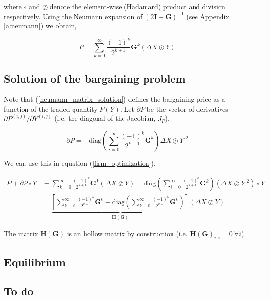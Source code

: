 \documentclass[american]{scrartcl}
\newcommand{\matr}[1]{\bm{#1}}
\newcommand{\diag}{\text{diag}}
\begin{document}
where $\circ$ and $\oslash$ denote the element-wise (Hadamard) product and division respectively. Using the Neumann expansion of $(2\matr{I} + \matr{G})^{-1}$ (see Appendix \ref{a:neumann}) we obtain,

\begin{equation} \label{neumann_matrix_solution}
	P = \sum^{\infty}_{k=0}\frac{(-1)^k}{2^{k+1}} \matr{G}^k (\Delta X \oslash Y)
\end{equation}

\subsection{Solution of the bargaining problem}

Note that (\ref{neumann_matrix_solution}) defines the bargaining price as a function of the traded quantity $P(Y)$. Let $\partial P$ be the vector of derivatives $\partial P^{(i, j)} / \partial Y^{(i, j)}$ (i.e. the diagonal of the Jacobian, $J_P$).

\begin{equation}
	\partial P = - \diag\left(\sum^\infty_{i=0} \frac{(-1)^k}{2^{k+1}} \matr{G}^k\right) \Delta X \oslash Y^{\circ 2}
\end{equation}

We can use this in equation (\ref{firm_optimization}),

\begin{equation} \label{foc_grid}
	\begin{split}
		P + \partial P \circ Y &= \sum^{\infty}_{k=0}\frac{(-1)^k}{2^{k+1}} \matr{G}^k (\Delta X \oslash Y) - \diag\left(\sum^\infty_{i=0} \frac{(-1)^k}{2^{k+1}} \matr{G}^k\right) (\Delta X \oslash Y^{\circ 2}) \circ Y \\
		&= \underbrace{\left[ \sum^{\infty}_{k=0}\frac{(-1)^k}{2^{k+1}} \matr{G}^k - \diag \left( \sum^{\infty}_{k=0}\frac{(-1)^k}{2^{k+1}} \matr{G}^k \right) \right]}_{\matr{H(G)}} (\Delta X \oslash Y)
	\end{split}
\end{equation}

The matrix $\matr{H(G)}$ is an hollow matrix by construction (i.e. $\matr{H(G)}_{i, i} = 0 \ \forall i$).

\subsection{Equilibrium}

\subsection{To do}
\end{document}
